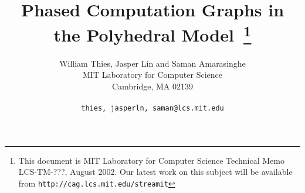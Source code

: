 \documentclass[10pt]{article}
\title{Phased Computation Graphs in the Polyhedral Model~\footnote{\small This document is MIT Laboratory for Computer Science Technical Memo LCS-TM-???, August 2002.  Our latest work on this subject will be available from \texttt{http://cag.lcs.mit.edu/streamit}} \hfill}
\author{William Thies, Jasper Lin and Saman Amarasinghe \\
  MIT Laboratory for Computer Science\\
  Cambridge, MA  02139\\ \\
  \texttt{\symbol{`\{}thies, jasperln, saman\symbol{`\}}@lcs.mit.edu}}
\date{}
\begin{document}
  \maketitle

  \newcommand{\mt}[1]{\mbox{\it #1}}
  \newcommand{\todo}[1]{\framebox{\bf #1}}
  \newcommand{\dep}[0]{Dependence Frontier}                %
  \newcommand{\DP}[0]{\textsc{Frontier}}                   %
  \newcommand{\DEP}[2]{\DP_{#1 \small{\rightarrow} #2}}    %
  \newcommand{\sssection}[1]{\medskip \noindent {\bf #1} \medskip}

  \begin{abstract}
    
  \end{abstract}

  
  
  
  
  
  
  

\vspace{-18pt}
  \begin{small}
    \begin{singlespace}
      
      
    \end{singlespace}
  \end{small}

  
  
\end{document}
